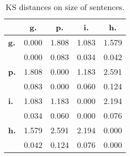 \begin{table}[h!]
\begin{center}
\begin{tabular}{| l || c | c | c | c |}\hline
 & {\bf g.} & {\bf p.} & {\bf i.} & {\bf h.} \\\hline\hline
{\bf g.} & 0.000 & 1.808 & 1.083 & 1.579 \\
{\bf } & 0.000 & 0.083 & 0.034 & 0.042 \\\hline
{\bf p.} & 1.808 & 0.000 & 1.183 & 2.591 \\
{\bf } & 0.083 & 0.000 & 0.060 & 0.124 \\\hline
{\bf i.} & 1.083 & 1.183 & 0.000 & 2.194 \\
{\bf } & 0.034 & 0.060 & 0.000 & 0.076 \\\hline
{\bf h.} & 1.579 & 2.591 & 2.194 & 0.000 \\
{\bf } & 0.042 & 0.124 & 0.076 & 0.000 \\\hline
\end{tabular}
\caption{KS distances on size of sentences.}
\end{center}
\end{table}